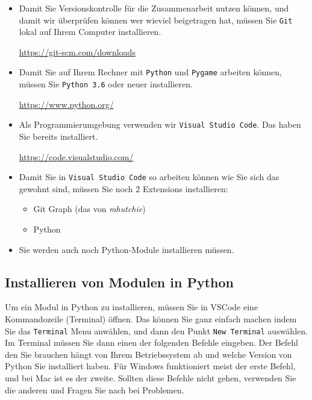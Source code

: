 \documentclass[11pt,a4paper]{report}
\begin{document}
\begin{itemize}
\item Damit Sie Versionskontrolle für die Zusammenarbeit nutzen können, und
    damit wir überprüfen können wer wieviel beigetragen hat, müssen Sie
    \verb|Git| lokal auf Ihrem Computer installieren.

    \begin{center}
        \url{https://git-scm.com/downloads}
    \end{center}

\item Damit Sie auf Ihrem Rechner mit \verb|Python| und \verb|Pygame| arbeiten können, müssen
    Sie \verb|Python 3.6| oder neuer installieren.

        \begin{center}
            \url{https://www.python.org/}
        \end{center}

\item Als Programmierumgebung verwenden wir \verb|Visual Studio Code|. Das
    haben Sie bereits installiert.

        \begin{center}
            \url{https://code.visualstudio.com/}
        \end{center}

\item Damit Sie in \verb|Visual Studio Code| so arbeiten können wie Sie sich
    das gewohnt sind, müssen Sie noch 2 Extensions installieren:
\begin{itemize}
\item Git Graph (das von \emph{mhutchie})
\item Python
\end{itemize}
\item Sie werden auch noch Python-Module installieren müssen.

\end{itemize}

\subsection{Installieren von Modulen in Python}

Um ein Modul in Python zu installieren, müssen Sie in VSCode eine Kommandozeile
(Terminal) öffnen. Das können Sie ganz einfach machen indem Sie das \verb|Terminal|
Menu anwählen, und dann den Punkt \verb|New Terminal| auswählen.
Im Terminal müssen Sie dann einen der folgenden Befehle eingeben. Der Befehl
den Sie brauchen hängt von Ihrem Betriebssystem ab und welche Version von
Python Sie installiert haben. Für Windows funktioniert meist der erste Befehl,
und bei Mac ist es der zweite. Sollten diese Befehle nicht gehen, verwenden Sie
die anderen und Fragen Sie nach bei Problemen.
\end{document}

